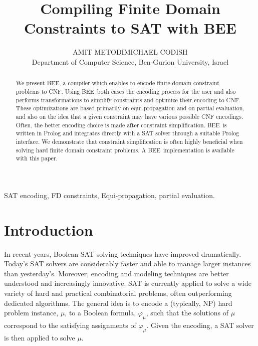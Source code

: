 \documentclass{tlp}
\newcommand{\bee}{\textsf{BEE}}
\begin{document}
\title[Compiling Finite Domain Constraints]{ Compiling Finite Domain
  \\Constraints to SAT with \bee }

\author[A.~Metodi and M.~Codish]{AMIT METODI\qquad MICHAEL CODISH\\
Department of Computer Science, Ben-Gurion University, Israel
}



\maketitle
\label{firstpage}


\begin{abstract}
  We present \bee, a compiler which enables to encode finite domain
  constraint problems to CNF. Using \bee\ both eases the encoding
  process for the user and also performs transformations to simplify
  constraints and optimize their encoding to CNF. These optimizations
  are based primarily on equi-propagation and on partial evaluation,
  and also on the idea that a given constraint may have various
  possible CNF encodings. Often, the better encoding choice is made
  after constraint simplification. \bee\ is written in Prolog and
  integrates directly with a SAT solver through a suitable Prolog
  interface. We demonstrate that constraint simplification is often
  highly beneficial when solving hard finite domain constraint
  problems. A  \bee\ implementation is available with this
  paper. 
\end{abstract}






\begin{keywords}
 SAT encoding,
 FD constraints, Equi-propagation, partial evaluation.
\end{keywords}

\section{Introduction}

In recent years, Boolean SAT solving techniques have improved
dramatically. Today's SAT solvers are considerably faster and able to
manage larger instances than yesterday's. Moreover, encoding and
modeling techniques are better understood and increasingly
innovative. SAT is currently applied to solve a wide variety of hard
and practical combinatorial problems, often outperforming
dedicated algorithms.
The general idea is to encode a (typically, NP) hard problem instance,
$\mu$, to a Boolean formula, $\varphi_\mu$, such that the solutions of
$\mu$ correspond to the satisfying assignments of $\varphi_\mu$. Given
the encoding, a SAT solver is then applied to solve $\mu$.
\end{document}
